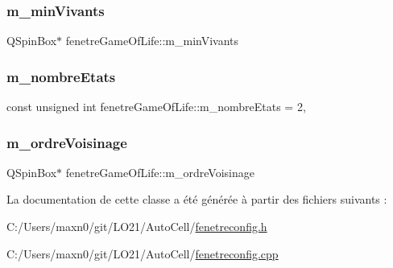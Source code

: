 \subsubsection{\texorpdfstring{m\+\_\+min\+Vivants}{m\_minVivants}}
{\footnotesize\ttfamily Q\+Spin\+Box$\ast$ fenetre\+Game\+Of\+Life\+::m\+\_\+min\+Vivants\hspace{0.3cm}{\ttfamily [private]}}

\mbox{\label{classfenetre_game_of_life_a979b46087690c0ba75798fb3d3db7acf}} 
\subsubsection{\texorpdfstring{m\+\_\+nombre\+Etats}{m\_nombreEtats}}
{\footnotesize\ttfamily const unsigned int fenetre\+Game\+Of\+Life\+::m\+\_\+nombre\+Etats = 2\hspace{0.3cm}{\ttfamily [static]}, {\ttfamily [private]}}

\mbox{\label{classfenetre_game_of_life_a7267e755bb11b6949a049df4198f6a11}} 
\subsubsection{\texorpdfstring{m\+\_\+ordre\+Voisinage}{m\_ordreVoisinage}}
{\footnotesize\ttfamily Q\+Spin\+Box$\ast$ fenetre\+Game\+Of\+Life\+::m\+\_\+ordre\+Voisinage\hspace{0.3cm}{\ttfamily [private]}}



La documentation de cette classe a été générée à partir des fichiers suivants \+:\begin{DoxyCompactItemize}
\item 
C\+:/\+Users/maxn0/git/\+L\+O21/\+Auto\+Cell/\mbox{\hyperlink{fenetreconfig_8h}{fenetreconfig.\+h}}\item 
C\+:/\+Users/maxn0/git/\+L\+O21/\+Auto\+Cell/\mbox{\hyperlink{fenetreconfig_8cpp}{fenetreconfig.\+cpp}}\end{DoxyCompactItemize}
